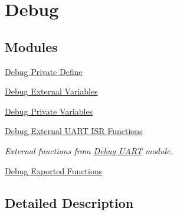 \hypertarget{group___debug}{}\section{Debug}
\label{group___debug}
\subsection*{Modules}
\begin{DoxyCompactItemize}
\item 
\hyperlink{group___debug___private___define}{Debug Private Define}
\item 
\hyperlink{group___debug___external___variables}{Debug External Variables}
\item 
\hyperlink{group___debug___private___variables}{Debug Private Variables}
\item 
\hyperlink{group___debug___external___functions}{Debug External U\+A\+R\+T I\+S\+R Functions}
\begin{DoxyCompactList}\small\item\em External functions from \hyperlink{group___debug___uart}{Debug U\+A\+RT} module. \end{DoxyCompactList}\item 
\hyperlink{group___debug___exported___functions}{Debug Exported Functions}
\end{DoxyCompactItemize}


\subsection{Detailed Description}

